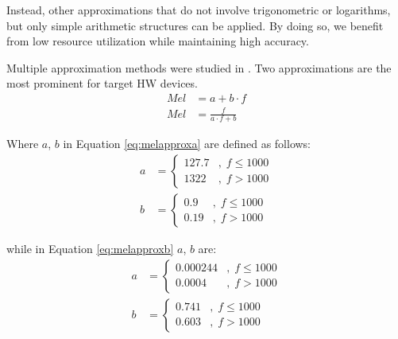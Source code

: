 Instead, other approximations that do not involve
trigonometric or logarithms, but only
simple arithmetic structures can be applied.
By doing so, we benefit from low resource
utilization while maintaining high accuracy.

Multiple approximation methods were studied in \cite{fitmelscale}.
Two approximations are the most prominent for target HW devices.
\begin{align}
    \label{eq:melapproxa} Mel & = a + b \cdot f \\ 
    Mel & = \frac{f}{a \cdot f + b} \label{eq:melapproxb}
\end{align}

Where \(a\), \(b\) in Equation \ref{eq:melapproxa} are defined as follows:
\begin{align}
    a & = \begin{cases}
        127.7   &,\;f \leq 1000 \\
        1322    &,\;f > 1000
    \end{cases} \nonumber \\
    b & = \begin{cases}
        0.9     &,\;f \leq 1000 \\
        0.19    &,\;f > 1000
    \end{cases}
\end{align}

while in Equation \ref{eq:melapproxb} \(a\), \(b\) are:
\begin{align}
    a & = \begin{cases}
        0.000244   &,\;f \leq 1000 \\
        0.0004    &,\;f > 1000
    \end{cases} \nonumber \\
    b & = \begin{cases}
        0.741   &,\;f \leq 1000 \\
        0.603   &,\;f > 1000
    \end{cases}
\end{align}

